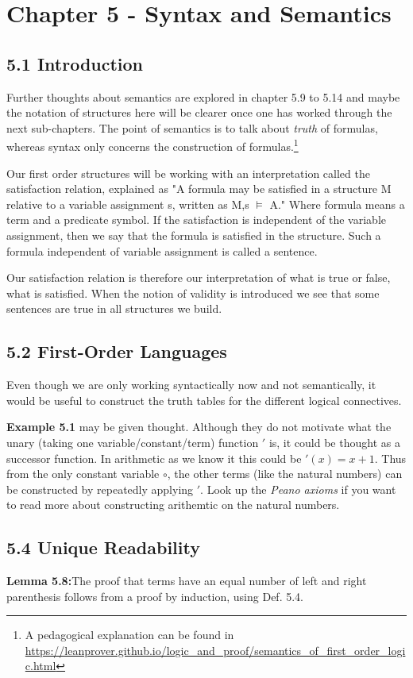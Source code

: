 \section*{Chapter 5 - Syntax and
Semantics}
\subsection*{5.1 Introduction}
Further thoughts about semantics are explored in chapter 5.9 to 5.14 and maybe the notation of structures here will be clearer once one has worked through the next sub-chapters. The point of semantics is to talk about {\it truth} of formulas, whereas syntax only concerns the construction of formulas.\footnote{A pedagogical explanation can be found in  \url{https://leanprover.github.io/logic_and_proof/semantics_of_first_order_logic.html}} 

Our first order structures will be working with an interpretation called the satisfaction relation, explained as "A formula may be satisfied in a structure M relative to a variable assignment s, written as M,s $\models$ A." Where formula means a term and a predicate symbol. If the satisfaction is independent of the variable assignment, then we say that the formula is satisfied in the structure. Such a formula independent of variable assignment is called a sentence.

Our satisfaction relation is therefore our interpretation of what is true or false, what is satisfied. When the notion of validity is introduced we see that some sentences are true in all structures we build.

\subsection*{5.2 First-Order Languages}
Even though we are only working syntactically now and not semantically, it would be useful to construct the truth tables for the different logical connectives. 

{\bf Example 5.1} may be given thought. Although they do not motivate what the unary (taking one variable/constant/term) function $\prime$ is, it could be thought as a successor function. In arithmetic as we know it this could be $\prime(x)=x+1$. Thus from the only constant variable $\circ$, the other terms (like the natural numbers) can be constructed by repeatedly applying $\prime$. Look up the {\it Peano axioms} if you want to read more about constructing arithemtic on the natural numbers. 

\subsection*{5.4 Unique Readability}
{\bf Lemma 5.8:}The proof that terms have an equal number of left and right parenthesis follows from a proof by induction, using Def. 5.4. 

